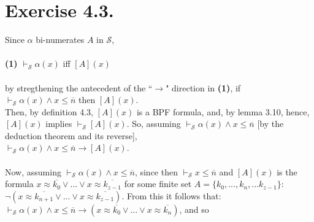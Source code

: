 \documentclass{article}
\begin{document}
\section*{Exercise 4.3.}
Since $\alpha$ bi-numerates  $A$ in $\mathscr{S}$,\\\\ \textbf{(1)} $\vdash_{\mathscr{S}} \alpha(x)$  iff  $[A](x)$\\\\
by stregthening the antecedent of the ``$\rightarrow$" direction in \textbf{(1)}, if \\$\vdash_{\mathscr{S}} \alpha(x) \wedge x \leq \overline{n}$  then  $[A](x)$.\\
Then, by definition 4.3, $[A](x)$ is a BPF formula, and, by lemma 3.10, hence, $[A](x)$ implies $\vdash_{\mathscr{S}} [A](x)$. So, assuming $\vdash_{\mathscr{S}} \alpha(x) \wedge x \leq \overline{n}$ [by the deduction theorem and its reverse], \\
$\vdash_{\mathscr{S}} \alpha(x) \wedge x \leq \overline{n} \rightarrow [A](x)$.\\\\
Now, assuming $\vdash_{\mathscr{S}} \alpha(x) \wedge x \leq \overline{n}$, since then $\vdash_{\mathscr{S}} x \leq \overline{n}$ and $[A](x)$ is the formula $x \approx \overline{k_0} \vee . . . \vee x \approx \overline{k_{z - 1}}$ for some finite set $A = \{k_{0}, ..., k_{n}, ... k_{z-1}\}$:\\ $\neg (x \approx \overline{k_{n+1}} \vee . . . \vee x \approx \overline{k_{z - 1}})$. From this it follows that:\\

$\vdash_{\mathscr{S}} \alpha(x) \wedge x \leq \overline{n} \rightarrow (x \approx \overline{k_0} \vee . . . \vee x \approx \overline{k_{n}})$, and so
\end{document}
